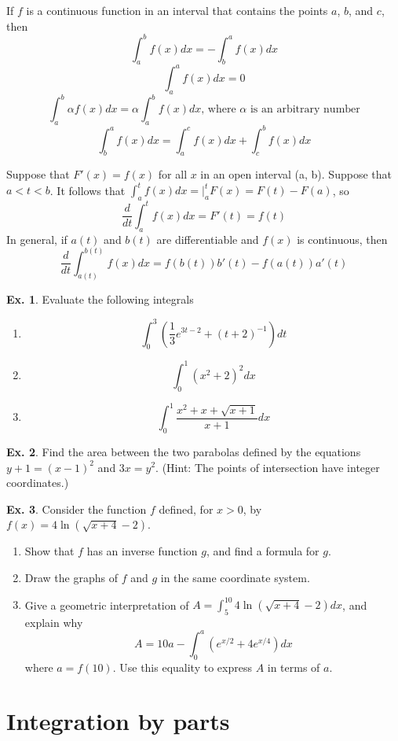 \documentclass[10pt,a4paper]{book}
\theoremstyle{definition}\newtheorem{definition}{Definition}
\theoremstyle{definition}\newtheorem{fact}{Fact}
\theoremstyle{definition}\newtheorem{ex}{Ex.}
\theoremstyle{definition}\newtheorem{project}{Project}
\theoremstyle{definition}\newtheorem{problem}{Problem}
\theoremstyle{definition}\newtheorem{example}{Example}
\numberwithin{theorem}{chapter}
\numberwithin{corollary}{chapter}
\numberwithin{assumption}{chapter}
\numberwithin{definition}{chapter}
\numberwithin{prop}{chapter}
\numberwithin{notation}{chapter}
\numberwithin{problem}{chapter}
\numberwithin{example}{chapter}
\numberwithin{fact}{chapter}
\numberwithin{ex}{chapter}
\begin{document}
	If $f$ is a continuous function in an interval that contains the points $a$, $b$, and $c$, then
	$$\int_a^b f(x) dx = -\int_b^a f(x) dx$$
	$$\int_a^a f(x) dx = 0$$
	$$\int_a^b \alpha f(x) dx = \alpha \int_a^b f(x) dx \text{, where $\alpha$ is an arbitrary number}$$
	$$\int_b^a f(x)dx = \int_a^cf(x)dx + \int_c^b f(x) dx$$
	
	Suppose that $F'(x) = f (x)$ for all $x$ in an open interval (a, b). Suppose that $a < t < b$. It follows that $\int_a^t f (x) dx = |_a^t F(x) = F(t) - F(a)$, so
	$$\frac{d}{dt}\int_a^t f(x)dx = F'(t) = f(t) $$
	In general, if $a(t)$ and $b(t)$ are differentiable and $f (x)$ is continuous, then
	$$\frac{d}{dt} \int_{a(t)}^{b(t)} f(x)dx = f(b(t)) b'(t)  - f(a(t))a'(t) $$
	
	\begin{ex}
		Evaluate the following integrals
		\begin{enumerate}[label=(\alph*)]
			\item $$\int_0^3 \left(\frac{1}{3}e^{3t-2}+(t+2)^{-1} \right) dt $$
			\item $$\int_0^1 (x^2+2)^2 dx$$
			\item $$\int_0^1 \frac{x^2+x+\sqrt{x+1}}{x+1}dx$$
		\end{enumerate}
	\end{ex}
	
	\begin{ex}
		Find the area between the two parabolas defined by the equations $y + 1 = (x - 1)^2$ and $3x = y^2$. (Hint: The points of intersection have integer coordinates.)
	\end{ex}
	
	\begin{ex}
		Consider the function $f$ defined, for $x > 0$, by $f (x) = 4 \ln (\sqrt{x + 4} - 2)$.
		\begin{enumerate}[label=(\alph*)]
			\item Show that $f$ has an inverse function $g$, and find a formula for $g$.
			\item Draw the graphs of $f$ and $g$ in the same coordinate system.
			\item Give a geometric interpretation of $A = \int_5^{10}4\ln (\sqrt{x+4} -2)dx$, and explain why
			$$A = 10a - \int_0^a(e^{x/2}+4e^{x/4})dx$$
			where $a = f(10)$. Use this equality to express $A$ in terms of $a$.
		\end{enumerate}
	\end{ex}
	
	\section{Integration by parts}
	
\end{document}
